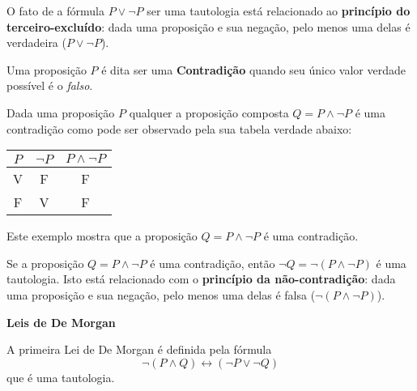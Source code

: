  \colorbox{amarelo}{
 \begin{minipage}{14cm}
 \begin{center}
 O fato de a fórmula $P \lor \neg P$ ser uma tautologia está relacionado ao \textbf{princípio do terceiro-excluído}: dada uma proposição e sua negação, pelo menos uma delas é verdadeira ($P \lor \neg P$).
 \end{center}
 \end{minipage}}
 
 \vskip0.3cm
 
 \colorbox{azul}{
 \begin{minipage}{14cm}
 \begin{center}
 Uma proposição $P$ é dita ser uma \textbf{Contradição} quando seu único valor verdade possível é o \emph{falso}.
 \end{center}
 \end{minipage}}
 
 \vskip0.3cm
 
\begin{exem}
  Dada uma proposição $P$ qualquer a proposição composta $Q= P \land \neg P$ é uma contradição como pode ser observado pela sua tabela verdade abaixo:
  \begin{table}[H]
  \centering
  \begin{tabular}{|c|c|c|} \hline
  \rowcolor{cinza}
  $P$ & $\neg P$ & $P \land \neg P$ \\ \hline
  V & F & F \\ \hline
  F & V & F \\ \hline
  \end{tabular}
  \end{table}
\end{exem}
 
 Este exemplo mostra que a proposição $Q= P \land \neg P$ é uma contradição.
 
 \vskip0.3cm
 
 \colorbox{amarelo}{
 \begin{minipage}{14cm}
 \begin{center}
 Se a proposição $Q= P \land \neg P$ é uma contradição, então $\neg Q= \neg ( P \land \neg P)$ é uma tautologia. Isto está relacionado com o \textbf{princípio da não-contradição}: dada uma proposição e sua negação, pelo menos uma delas é falsa ($\neg(P \land \neg P)$).
 \end{center}
 \end{minipage}}
 
 \vskip0.3cm
 
 \colorbox{azul}{
 \begin{minipage}{14cm}
 \begin{center}
 \textbf{Leis de De Morgan}
 
 A primeira Lei de De Morgan é definida pela fórmula
 \[\neg(P \land Q) \leftrightarrow (\neg P \lor \neg Q)\]
 que é uma tautologia. 
 \end{center}
 \end{minipage}}
 
